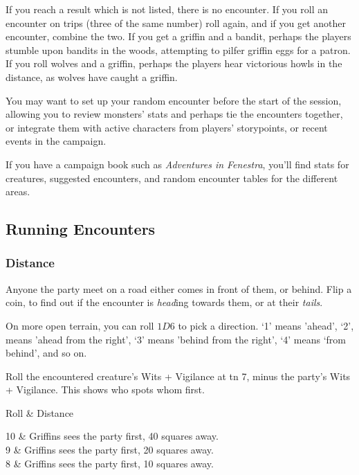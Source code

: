 \begin{multicols}{2}
If you reach a result which is not listed, there is no encounter.
If you roll an encounter on trips (three of the same number) roll again, and if you get another encounter, combine the two.
If you get a griffin and a bandit, perhaps the players stumble upon bandits in the woods, attempting to pilfer griffin eggs for a patron.
If you roll wolves and a griffin, perhaps the players hear victorious howls in the distance, as wolves have caught a griffin.

You may want to set up your random encounter before the start of the session, allowing you to review monsters' stats and perhaps tie the encounters together, or integrate them with active characters from players' \glspl{storypoint}, or recent events in the campaign.

If you have a campaign book such as \textit{Adventures in Fenestra}, you'll find stats for creatures, suggested encounters, and random encounter tables for the different areas.

\subsection{Running Encounters}

\subsubsection{Distance}

Anyone the party meet on a road either comes in front of them, or behind.
Flip a coin, to find out if the encounter is \textit{head}ing towards them, or at their \textit{tails}.

On more open terrain, you can roll $1D6$ to pick a direction.
`1' means 'ahead', `2', means 'ahead from the right', `3' means 'behind from the right', `4' means `from behind', and so on.

Roll the encountered creature's Wits + Vigilance at \gls{tn} 7, minus the party's Wits + Vigilance.
This shows who spots whom first.

\begin{rollchart}

	Roll & Distance \\\hline

	10 & Griffins sees the party first, 40 squares away. \\

	9 & Griffins sees the party first, 20 squares away. \\

	8 & Griffins sees the party first, 10 squares away. \\


\end{rollchart}
\end{multicols}
